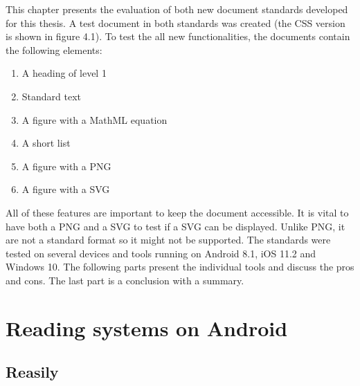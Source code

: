This chapter presents the evaluation of both new document standards developed for this thesis. A test document in both standards was created (the CSS version is shown in figure 4.1). To test the all new functionalities, the documents contain the following elements:
\begin{enumerate}
	\item A heading of level 1
	\item Standard text
	\item A figure with a MathML equation
	\item A short list
	\item A figure with a PNG
	\item A figure with a SVG
\end{enumerate}


All of these features are important to keep the document accessible. It is vital to have both a PNG and a SVG to test if a SVG can be displayed. Unlike PNG, it are not a standard format so it might not be supported. The standards were tested on several devices and tools running on Android 8.1, iOS 11.2 and Windows 10.
The following parts present the individual tools and discuss the pros and cons. The last part is a conclusion with a summary. 


\section{Reading systems on Android}
	
\subsection{Reasily}

